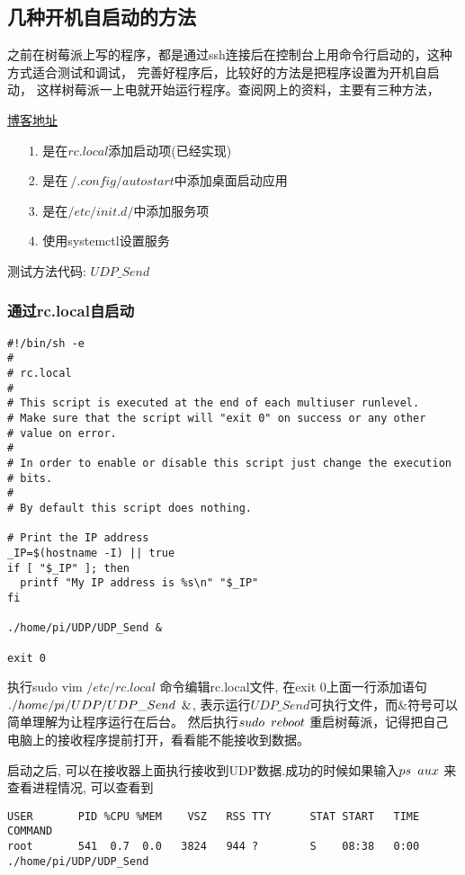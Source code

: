 \subsection{几种开机自启动的方法}
之前在树莓派上写的程序，都是通过ssh连接后在控制台上用命令行启动的，这种方式适合测试和调试，
完善好程序后，比较好的方法是把程序设置为开机自启动，
这样树莓派一上电就开始运行程序。查阅网上的资料，主要有三种方法，
\par \href{https://blog.csdn.net/wangzhenyang2/article/details/80215149?utm_medium=distribute.pc_relevant.none-task-blog-BlogCommendFromMachineLearnPai2-1.nonecase&depth_1-utm_source=distribute.pc_relevant.none-task-blog-BlogCommendFromMachineLearnPai2-1.nonecase}{博客地址}
\begin{itemize}
    \item [1.] 是在$rc.local$添加启动项(已经实现)
    \item [2.] 是在$~/.config/autostart$中添加桌面启动应用
    \item [3.] 是在$/etc/init.d/$中添加服务项
    \item [4.] 使用systemctl设置服务
\end{itemize}
测试方法代码: \href{https://github.com/fengxuewei-dev/latex_thesis/blob/master/UDP/UDP_Send/UDP_Send}{$UDP\_Send$}
\subsubsection{通过rc.local自启动}

\begin{lstlisting}[title=$/etc/rc.local$]
#!/bin/sh -e
#
# rc.local
#
# This script is executed at the end of each multiuser runlevel.
# Make sure that the script will "exit 0" on success or any other
# value on error.
#
# In order to enable or disable this script just change the execution
# bits.
#
# By default this script does nothing.

# Print the IP address
_IP=$(hostname -I) || true
if [ "$_IP" ]; then
  printf "My IP address is %s\n" "$_IP"
fi

./home/pi/UDP/UDP_Send &

exit 0
\end{lstlisting}

\par 执行sudo vim $/etc/rc.local$ 命令编辑rc.local文件, 
在exit 0上面一行添加语句\\$./home/pi/UDP/UDP\_Send\hspace{0.5em}\&$, 
表示运行$UDP\_Send$可执行文件，而$\&$符号可以简单理解为让程序运行在后台。
然后执行$sudo \hspace{0.5em} reboot$ 重启树莓派，记得把自己电脑上的接收程序提前打开，看看能不能接收到数据。
\par 启动之后, 可以在接收器上面执行接收到UDP数据.成功的时候如果输入$ps\hspace{0.5em}aux$ 来查看进程情况, 可以查看到
\begin{lstlisting}[title=进程执行]
USER       PID %CPU %MEM    VSZ   RSS TTY      STAT START   TIME COMMAND
root       541  0.7  0.0   3824   944 ?        S    08:38   0:00 ./home/pi/UDP/UDP_Send 
\end{lstlisting}

